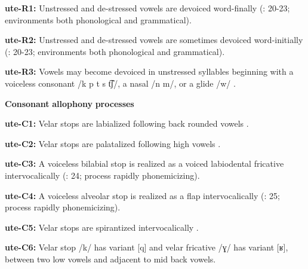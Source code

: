 \documentclass[output=paper]{langsci/langscibook}
\begin{document}
\begin{styleBody}
\textbf{ute-R1:} Unstressed and de-stressed vowels are devoiced word-finally (\citealt{Givón2011}: 20-23; environments both phonological and grammatical).
\end{styleBody}

\begin{styleBody}
\textbf{ute-R2:} Unstressed and de-stressed vowels are sometimes devoiced word-initially (\citealt{Givón2011}: 20-23; environments both phonological and grammatical).
\end{styleBody}

\begin{styleBody}
\textbf{ute-R3:} Vowels may become devoiced in unstressed syllables beginning with a voiceless consonant /k p t s t͡ʃ/, a nasal /n m/, or a glide /w/ \citep[21]{Givón2011}.
\end{styleBody}

\begin{styleBody}
\textbf{Consonant} \textbf{allophony} \textbf{processes}
\end{styleBody}

\begin{styleBody}
\textbf{ute-C1:} Velar stops are labialized following back rounded vowels \citep[29]{Givón2011}.
\end{styleBody}

\begin{styleBody}
\textbf{ute-C2:} Velar stops are palatalized following high vowels \citep[29]{Givón2011}.
\end{styleBody}

\begin{styleBody}
\textbf{ute-C3:} A voiceless bilabial stop is realized as a voiced labiodental fricative intervocalically (\citealt{Givón2011}: 24; process rapidly phonemicizing).
\end{styleBody}

\begin{styleBody}
\textbf{ute-C4:} A voiceless alveolar stop is realized as a flap intervocalically (\citealt{Givón2011}: 25; process rapidly phonemicizing).
\end{styleBody}

\begin{styleBody}
\textbf{ute-C5:} Velar stops are spirantized intervocalically \citep[26-7]{Givón2011}.
\end{styleBody}

\begin{styleBody}
\textbf{ute-C6:} Velar stop /k/ has variant [q] and velar fricative /ɣ/ has variant [ʁ], between two low vowels and adjacent to mid back vowels.
\end{styleBody}
\end{document}
